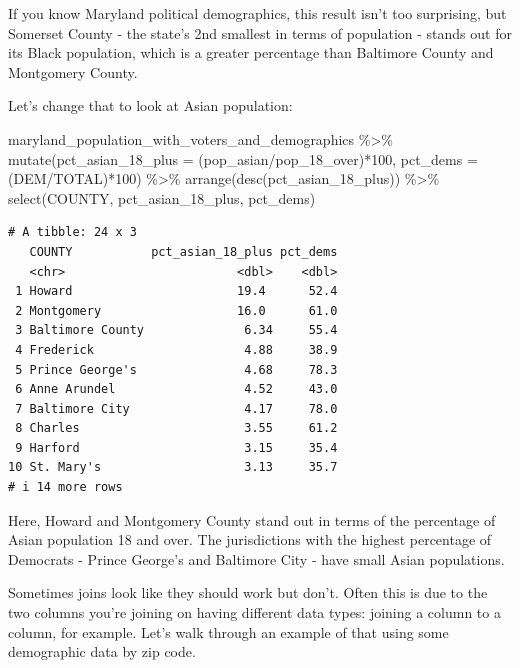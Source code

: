 \documentclass[
  letterpaper,
  DIV=11,
  numbers=noendperiod]{scrreprt}
\newenvironment{Shaded}{\begin{snugshade}}{\end{snugshade}}
\newcommand{\AttributeTok}[1]{\textcolor[rgb]{0.40,0.45,0.13}{#1}}
\newcommand{\DecValTok}[1]{\textcolor[rgb]{0.68,0.00,0.00}{#1}}
\newcommand{\FunctionTok}[1]{\textcolor[rgb]{0.28,0.35,0.67}{#1}}
\newcommand{\NormalTok}[1]{\textcolor[rgb]{0.00,0.23,0.31}{#1}}
\newcommand{\SpecialCharTok}[1]{\textcolor[rgb]{0.37,0.37,0.37}{#1}}
\begin{document}
If you know Maryland political demographics, this result isn't too
surprising, but Somerset County - the state's 2nd smallest in terms of
population - stands out for its Black population, which is a greater
percentage than Baltimore County and Montgomery County.

Let's change that to look at Asian population:

\begin{Shaded}
\begin{Highlighting}[]
\NormalTok{maryland\_population\_with\_voters\_and\_demographics }\SpecialCharTok{\%\textgreater{}\%}
  \FunctionTok{mutate}\NormalTok{(}\AttributeTok{pct\_asian\_18\_plus =}\NormalTok{ (pop\_asian}\SpecialCharTok{/}\NormalTok{pop\_18\_over)}\SpecialCharTok{*}\DecValTok{100}\NormalTok{, }\AttributeTok{pct\_dems =}\NormalTok{ (DEM}\SpecialCharTok{/}\NormalTok{TOTAL)}\SpecialCharTok{*}\DecValTok{100}\NormalTok{) }\SpecialCharTok{\%\textgreater{}\%}
  \FunctionTok{arrange}\NormalTok{(}\FunctionTok{desc}\NormalTok{(pct\_asian\_18\_plus)) }\SpecialCharTok{\%\textgreater{}\%}
  \FunctionTok{select}\NormalTok{(COUNTY, pct\_asian\_18\_plus, pct\_dems)}
\end{Highlighting}
\end{Shaded}

\begin{verbatim}
# A tibble: 24 x 3
   COUNTY           pct_asian_18_plus pct_dems
   <chr>                        <dbl>    <dbl>
 1 Howard                       19.4      52.4
 2 Montgomery                   16.0      61.0
 3 Baltimore County              6.34     55.4
 4 Frederick                     4.88     38.9
 5 Prince George's               4.68     78.3
 6 Anne Arundel                  4.52     43.0
 7 Baltimore City                4.17     78.0
 8 Charles                       3.55     61.2
 9 Harford                       3.15     35.4
10 St. Mary's                    3.13     35.7
# i 14 more rows
\end{verbatim}

Here, Howard and Montgomery County stand out in terms of the percentage
of Asian population 18 and over. The jurisdictions with the highest
percentage of Democrats - Prince George's and Baltimore City - have
small Asian populations.

Sometimes joins look like they should work but don't. Often this is due
to the two columns you're joining on having different data types:
joining a column to a column, for example. Let's walk through an example
of that using some demographic data by zip code.
\end{document}
